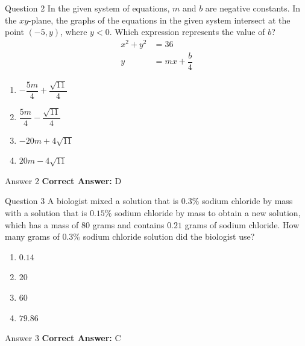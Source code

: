 \documentclass{beamer}
\begin{document}
\begin{frame}{Question 2}
\small
In the given system of equations, \(m\) and \(b\) are negative constants. In the \(xy\)-plane, the graphs of the equations in the given system intersect at the point \((-5, y)\), where \(y < 0\). Which expression represents the value of \(b\)?
\[
\begin{aligned}
x^{2} + y^{2} &= 36 \\
y &= mx + \dfrac{b}{4}
\end{aligned}
\]
\vspace{0.35cm}
\begin{enumerate}
    \item[A.] \(-\dfrac{5m}{4} + \dfrac{\sqrt{11}}{4}\)
    \item[B.] \(\dfrac{5m}{4} - \dfrac{\sqrt{11}}{4}\)
    \item[C.] \(-20m + 4\sqrt{11}\)
    \item[D.] \(20m - 4\sqrt{11}\)
\end{enumerate}
\end{frame}
\begin{frame}{Answer 2}
\small
\textbf{Correct Answer:} D
\end{frame}

\begin{frame}{Question 3}
\small
A biologist mixed a solution that is \(0.3\%\) sodium chloride by mass with a solution that is \(0.15\%\) sodium chloride by mass to obtain a new solution, which has a mass of \(80\) grams and contains \(0.21\) grams of sodium chloride. How many grams of \(0.3\%\) sodium chloride solution did the biologist use?
\vspace{0.35cm}
\begin{enumerate}
    \item[A.] \(0.14\)
    \item[B.] \(20\)
    \item[C.] \(60\)
    \item[D.] \(79.86\)
\end{enumerate}
\end{frame}
\begin{frame}{Answer 3}
\small
\textbf{Correct Answer:} C
\end{frame}
\end{document}
